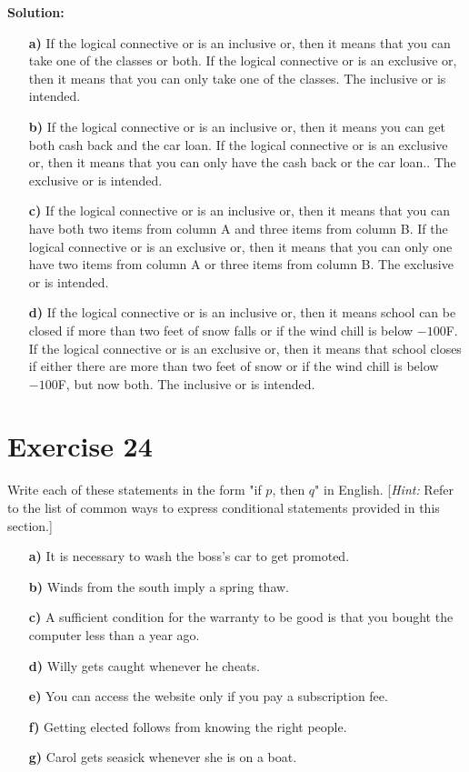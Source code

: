 \documentclass{Axon}
\begin{document}
\noindent
\textbf{Solution:}
\begin{enumerate}
    \item[\textbf{a)}] If the logical connective or is an inclusive or, then it means that you can take one of the classes or both. If the logical connective or is an exclusive or, then it means that you can only take one of the classes. The inclusive or is intended.
    \item[\textbf{b)}] If the logical connective or is an inclusive or, then it means you can get both cash back and the car loan. If the logical connective or is an exclusive or, then it means that you can only have the cash back or the car loan.. The exclusive or is intended.
    \item[\textbf{c)}] If the logical connective or is an inclusive or, then it means that you can have both two items from column A and three items from column B. If the logical connective or is an exclusive or, then it means that you can only one have two items from column A or three items from column B. The exclusive or is intended.
    \item[\textbf{d)}] If the logical connective or is an inclusive or, then it means school can be closed if more than two feet of snow falls or if the wind chill is below \(-100\)\textdegree F. If the logical connective or is an exclusive or, then it means that school closes if either there are more than two feet of snow or if the wind chill is below \(-100\)\textdegree F, but now both. The inclusive or is intended.
\end{enumerate}

\section*{Exercise 24}
Write each of these statements in the form "if \(p\), then \(q\)" in English. [\textit{Hint:} Refer to the list of common ways to express conditional statements provided in this section.]
\begin{enumerate}
    \item[\textbf{a)}] It is necessary to wash the boss's car to get promoted.
    \item[\textbf{b)}] Winds from the south imply a spring thaw.
    \item[\textbf{c)}] A sufficient condition for the warranty to be good is that you bought the computer less than a year ago.
    \item[\textbf{d)}] Willy gets caught whenever he cheats.
    \item[\textbf{e)}] You can access the website only if you pay a subscription fee.
    \item[\textbf{f)}] Getting elected follows from knowing the right people.
    \item[\textbf{g)}] Carol gets seasick whenever she is on a boat.
\end{enumerate}
\end{document}
